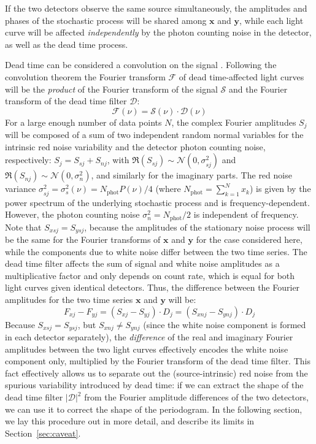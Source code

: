\documentclass[twocolumn]{aastex61}
\newcommand{\Normal}{\ensuremath{{\mathcal N}}\xspace}
\begin{document}
If the two detectors observe the same source simultaneously, the amplitudes and phases of the stochastic process will be shared among $\mathbf{x}$ and $\mathbf{y}$, while each light curve will be affected \textit{independently} by the photon counting noise in the detector, as well as the dead time process. 

Dead time can be considered a convolution on the signal \citep{Vikhlinin+94}. 
Following the convolution theorem the Fourier transform $\mathcal{F}$ of dead time-affected light curves will be the \textit{product} of the Fourier transform of the signal $\mathcal{S}$ and the Fourier transform of the dead time filter $\mathcal{D}$:
\begin{equation}
\mathcal{F}(\nu) = \mathcal{S}(\nu)\cdot\mathcal{D}(\nu)
\end{equation}
For a large enough number of data points $N$, the complex Fourier amplitudes $S_j$ will be composed of a sum of two independent random normal variables for the intrinsic red noise variability and the detector photon counting noise, respectively: $S_j = S_{sj} + S_{nj}$, with $\Re (S_{sj}) \sim \Normal(0, \sigma_{sj}^2)$ and $\Re(S_{nj}) \sim \Normal(0, \sigma_n^2)$, and similarly for the imaginary parts.
The red noise variance $\sigma_{sj}^2 = \sigma_{s}^2(\nu) = N_\mathrm{phot}P(\nu)/4$ (where $N_{\mathrm{phot}} = \sum_{k=1}^{N}{x_k}$) is given by the power spectrum of the underlying stochastic process and is frequency-dependent. However, the photon counting noise $\sigma_n^2 = N_\mathrm{phot}/2$ is independent of frequency. 
Note that $S_{xsj} = S_{ysj}$, because the amplitudes of the stationary noise process will be the same for the Fourier transforms of $\mathbf{x}$ and $\mathbf{y}$ for the case considered here, while the components due to white noise differ between the two time series.
The dead time filter affects the sum of signal and white noise amplitudes as a multiplicative factor and only depends on count rate, which is equal for both light curves given identical detectors.
Thus, the difference between the Fourier amplitudes for the two time series $\mathbf{x}$ and $\mathbf{y}$ will be:
\begin{equation}
F_{xj} - F_{yj} = (S_{xj} - S_{yj})\cdot D_j = (S_{xnj} - S_{ynj})\cdot D_j
\end{equation}
Because $S_{xsj} = S_{ysj}$, but $S_{xnj} \neq S_{ynj}$ (since the white noise component is formed in each detector separately), the \textit{difference} of the real and imaginary Fourier amplitudes between the two light curves effectively encodes the white noise component only, multiplied by the Fourier transform of the dead time filter.
This fact effectively allows us to separate out the (source-intrinsic) red noise from the spurious variability introduced by dead time: if we can extract the shape of the dead time filter $|\mathcal{D}|^2$ from the Fourier amplitude differences of the two detectors, we can use it to correct the shape of the periodogram. In the following section, we lay this procedure out in more detail, and describe its limits in Section~\ref{sec:caveat}.
\end{document}
